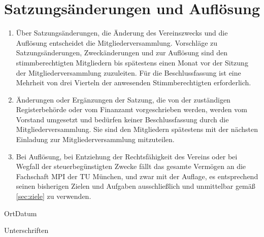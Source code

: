 \documentclass{article}
\begin{document}
\section{Satzungsänderungen und Auflösung}
\label{sec:satzungsaenderung}
\begin{enumerate}
	\item Über Satzungsänderungen, die Änderung des Vereinszwecks und die Auflösung  entscheidet die Mitgliederversammlung. Vorschläge zu Satzungsänderungen, Zweckänderungen und zur Auflösung sind den stimmberechtigten Mitgliedern bis spätestens einen Monat vor der Sitzung der Mitgliederversammlung zuzuleiten. Für die Beschlussfassung ist eine Mehrheit von drei Vierteln der anwesenden Stimmberechtigten erforderlich.
	\item Änderungen oder Ergänzungen der Satzung, die von der zuständigen Registerbehörde oder vom Finanzamt vorgeschrieben werden, werden vom Vorstand umgesetzt und bedürfen keiner Beschlussfassung durch die Mitgliederversammlung. Sie sind den Mitgliedern spätestens mit der nächsten Einladung zur Mitgliederversammlung mitzuteilen.
	\item Bei Auflösung, bei Entziehung der Rechtsfähigkeit des Vereins oder bei Wegfall der steuerbegünstigten Zwecke fällt das gesamte Vermögen an die Fachschaft MPI der TU München, und zwar mit der Auflage, es entsprechend seinen bisherigen Zielen und Aufgaben ausschließlich und unmittelbar gemäß \ref{sec:ziele} zu verwenden.
\end{enumerate}

\vspace{2cm}
\hspace{2cm}Ort\hspace{7cm}Datum
\vspace{6cm}
\begin{center}
Unterschriften
\end{center}
\end{document}
